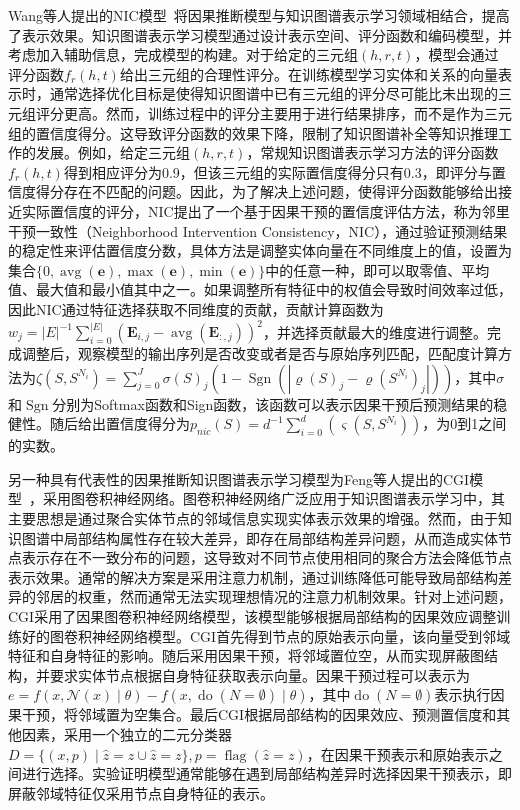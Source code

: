 \documentclass[algorithmlist, AutoFakeBold, AutoFakeSlant, figurelist, tablelist, nomlist, masters]{seuthesix}
\begin{document}
Wang等人提出的NIC模型~\cite{wang2021neighborhood}将因果推断模型与知识图谱表示学习领域相结合，提高了表示效果。知识图谱表示学习模型通过设计表示空间、评分函数和编码模型，并考虑加入辅助信息，完成模型的构建。对于给定的三元组$\left(h, r, t\right)$，模型会通过评分函数$f_r\left(h, t\right)$给出三元组的合理性评分。在训练模型学习实体和关系的向量表示时，通常选择优化目标是使得知识图谱中已有三元组的评分尽可能比未出现的三元组评分更高。然而，训练过程中的评分主要用于进行结果排序，而不是作为三元组的置信度得分。这导致评分函数的效果下降，限制了知识图谱补全等知识推理工作的发展。例如，给定三元组$\left(h, r, t\right)$，常规知识图谱表示学习方法的评分函数$f_r\left(h, t\right)$得到相应评分为0.9，但该三元组的实际置信度得分只有0.3，即评分与置信度得分存在不匹配的问题。因此，为了解决上述问题，使得评分函数能够给出接近实际置信度的评分，NIC提出了一个基于因果干预的置信度评估方法，称为邻里干预一致性（Neighborhood Intervention Consistency，NIC），通过验证预测结果的稳定性来评估置信度分数，具体方法是调整实体向量在不同维度上的值，设置为集合$\{0, \operatorname{avg}(\bm{e}), \max (\bm{e}), \min (\bm{e})\}$中的任意一种，即可以取零值、平均值、最大值和最小值其中之一。如果调整所有特征中的权值会导致时间效率过低，因此NIC通过特征选择获取不同维度的贡献，贡献计算函数为$w_j=|E|^{-1} \sum_{i=0}^{|E|}\left(\mathbf{E}_{i, j}-\operatorname{avg}\left(\mathbf{E}_{:, j}\right)\right)^2$，并选择贡献最大的维度进行调整。完成调整后，观察模型的输出序列是否改变或者是否与原始序列匹配，匹配度计算方法为$\zeta\left(S, S^{N_i}\right)=\sum_{j=0}^J \sigma(S)_j\left(1-\operatorname{Sgn}\left(\left|\varrho(S)_j-\varrho\left(S^{N_i}\right)_j\right|\right)\right)$，其中$\sigma$和$\operatorname{Sgn}$分别为Softmax函数和Sign函数，该函数可以表示因果干预后预测结果的稳健性。随后给出置信度得分为$p_{n i c}(S)=d^{-1} \sum_{i=0}^d\left(\varsigma\left(S, S^{N_i}\right)\right)$，为0到1之间的实数。

另一种具有代表性的因果推断知识图谱表示学习模型为Feng等人提出的CGI模型~\cite{feng2021should}，采用图卷积神经网络。图卷积神经网络广泛应用于知识图谱表示学习中，其主要思想是通过聚合实体节点的邻域信息实现实体表示效果的增强。然而，由于知识图谱中局部结构属性存在较大差异，即存在局部结构差异问题，从而造成实体节点表示存在不一致分布的问题，这导致对不同节点使用相同的聚合方法会降低节点表示效果。通常的解决方案是采用注意力机制，通过训练降低可能导致局部结构差异的邻居的权重，然而通常无法实现理想情况的注意力机制效果。针对上述问题，CGI采用了因果图卷积神经网络模型，该模型能够根据局部结构的因果效应调整训练好的图卷积神经网络模型。CGI首先得到节点的原始表示向量，该向量受到邻域特征和自身特征的影响。随后采用因果干预，将邻域置位空，从而实现屏蔽图结构，并要求实体节点根据自身特征获取表示向量。因果干预过程可以表示为$e=f(x, \mathcal{N}(x) \mid \theta)-f(x, \operatorname{do}(N=\emptyset) \mid \theta)$，其中$\operatorname{do}(N=\emptyset)$表示执行因果干预，将邻域置为空集合。最后CGI根据局部结构的因果效应、预测置信度和其他因素，采用一个独立的二元分类器$D=\{(x, p) \mid \hat{z}=z \cup \hat{z}=z\}, p=\operatorname{flag}(\hat{z}=z)$，在因果干预表示和原始表示之间进行选择。实验证明模型通常能够在遇到局部结构差异时选择因果干预表示，即屏蔽邻域特征仅采用节点自身特征的表示。
\end{document}
